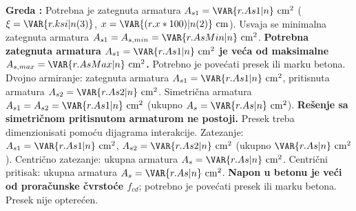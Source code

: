 \textbf{Greda :}
Potrebna je zategnuta armatura $A_{s1} = \VAR{r.As1|n} \ \mathrm{cm^2}$ ($\xi = \VAR{r.ksi|n(3)}$, $x = \VAR{(r.x*100)|n(2)} \ \mathrm{cm}$).
Usvaja se minimalna zategnuta armatura $A_{s1} = A_{s,min} = \VAR{r.AsMin|n} \ \mathrm{cm^2}$.
\textbf{Potrebna zategnuta armatura $A_{s1} = \VAR{r.As1|n} \ \mathrm{cm^2}$ je veća od maksimalne $A_{s,max} = \VAR{r.AsMax|n} \ \mathrm{cm^2}$.} Potrebno je povećati presek ili marku betona.
Dvojno armiranje: zategnuta armatura $A_{s1} = \VAR{r.As1|n} \ \mathrm{cm^2}$, pritisnuta armatura $A_{s2} = \VAR{r.As2|n} \ \mathrm{cm^2}$.
Simetrična armatura $A_{s1} = A_{s2} = \VAR{r.As1|n} \ \mathrm{cm^2}$ (ukupno $A_s = \VAR{r.As|n} \ \mathrm{cm^2}$).
\textbf{Rešenje sa simetričnom pritisnutom armaturom ne postoji.} Presek treba dimenzionisati pomoću dijagrama interakcije.
Zatezanje: $A_{s1} = \VAR{r.As1|n} \ \mathrm{cm^2}$, $A_{s2} = \VAR{r.As2|n} \ \mathrm{cm^2}$ (ukupno $\VAR{r.As|n} \ \mathrm{cm^2}$).
Centrično zatezanje: ukupna armatura $A_s = \VAR{r.As|n} \ \mathrm{cm^2}$.
Centrični pritisak: ukupna armatura $A_s = \VAR{r.As|n} \ \mathrm{cm^2}$.
\textbf{Napon u betonu je veći od proračunske čvrstoće $f_{cd}$}; potrebno je povećati presek ili marku betona.
Presek nije opterećen.



